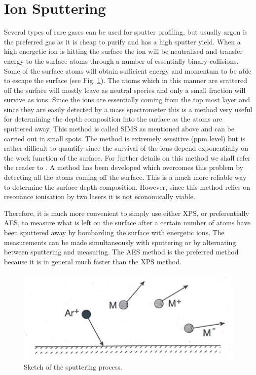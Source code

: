 \section{Ion Sputtering}
Several types of rare gases can be used for sputter profiling, but usually argon is the preferred gas as it is cheap to purify and has a high sputter yield. When a high energetic ion is hitting the surface the ion will be neutralised and transfer energy to the surface atoms through a number of essentially binary collisions. Some of the surface atoms will obtain sufficient energy and momentum to be able to escape the surface (see Fig. \ref{fig:sputtering}). The atoms which in this manner are scattered off the surface will mostly leave as neutral species and only a small fraction will survive as ions. Since the ions are essentially coming from the top most layer and since they are easily detected by a mass spectrometer this is a method very useful for determining the depth composition into the surface as the atoms are sputtered away. This method is called SIMS as mentioned above and can be carried out in small spots. The method is extremely sensitive (ppm level) but is rather difficult to quantify since the survival of the ions depend exponentially on the work function of the surface. For further details on this method we shall refer the reader to \cite{briggs2}. A method has been developed which overcomes this problem by detecting all the atoms coming off the surface. This is a much more reliable way to determine the surface depth composition. However, since this method relies on resonance ionisation by two lasers it is not economically viable.

Therefore, it is much more convenient to simply use either XPS, or preferentially AES, to measure what is left on the surface after a certain number of atoms have been sputtered away by bombarding the surface with energetic  ions. The measurements can be made simultaneously with sputtering or by alternating between sputtering and measuring. The AES method is the preferred method because it is in general much faster than the XPS method.

\begin{figure}[h!]
 	\begin{center}
 	\includegraphics[scale=3]{figures/07_03.png}
 	\caption{Sketch of the sputtering process.}
 	\label{fig:sputtering}
 	\end{center}
 \end{figure} 

